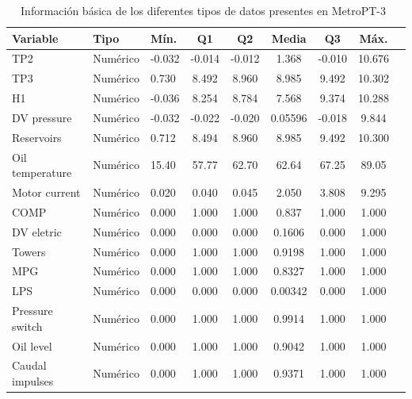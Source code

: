 \documentclass[12pt,letterpaper]{article}
\begin{document}
\begin{table}[htp]
    \centering
    \begin{tabular}{lllcccccc}
    \hline
        \textbf{Variable} & \textbf{Tipo} & \textbf{Mín.} & \textbf{Q1} & \textbf{Q2} & \textbf{Media} & \textbf{Q3} & \textbf{Máx.} \\ \hline
TP2               & Numérico      & -0.032        & -0.014      & -0.012      & 1.368         & -0.010      & 10.676        \\ 
TP3               & Numérico      & 0.730         & 8.492       & 8.960       & 8.985         & 9.492       & 10.302        \\ 
H1                & Numérico      & -0.036        & 8.254       & 8.784       & 7.568         & 9.374       & 10.288        \\ 
DV pressure      & Numérico      & -0.032        & -0.022      & -0.020      & 0.05596       & -0.018      & 9.844         \\ 
Reservoirs        & Numérico      & 0.712         & 8.494       & 8.960       & 8.985         & 9.492       & 10.300        \\ 
Oil temperature  & Numérico      & 15.40         & 57.77       & 62.70       & 62.64         & 67.25       & 89.05         \\ 
Motor current    & Numérico      & 0.020         & 0.040       & 0.045       & 2.050         & 3.808       & 9.295         \\ 
COMP              & Numérico      & 0.000         & 1.000       & 1.000       & 0.837         & 1.000       & 1.000         \\ 
DV eletric       & Numérico      & 0.000         & 0.000       & 0.000       & 0.1606        & 0.000       & 1.000         \\ 
Towers            & Numérico      & 0.000         & 1.000       & 1.000       & 0.9198        & 1.000       & 1.000         \\ 
MPG               & Numérico      & 0.000         & 1.000       & 1.000       & 0.8327        & 1.000       & 1.000         \\ 
LPS               & Numérico      & 0.000         & 0.000       & 0.000       & 0.00342       & 0.000       & 1.000         \\ 
Pressure switch  & Numérico      & 0.000         & 1.000       & 1.000       & 0.9914        & 1.000       & 1.000         \\ 
Oil level        & Numérico      & 0.000         & 1.000       & 1.000       & 0.9042        & 1.000       & 1.000         \\ 
Caudal impulses  & Numérico      & 0.000         & 1.000       & 1.000       & 0.9371        & 1.000       & 1.000         \\ \hline
    \end{tabular}
    \caption{Información básica de los diferentes tipos de datos presentes en MetroPT-3~\cite{MetroPT-3}}
    \label{tab:DatosBasicos}
\end{table}
\end{document}
